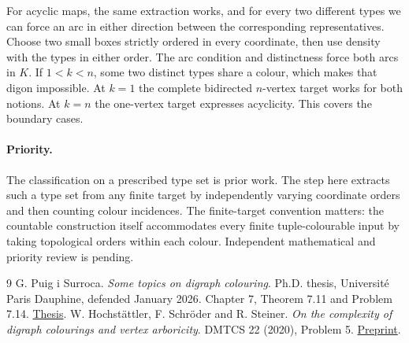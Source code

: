 \documentclass[11pt]{article}
\begin{document}
For acyclic maps, the same extraction works, and for every two different types we can force an arc in either direction between the corresponding representatives. Choose two small boxes strictly ordered in every coordinate, then use density with the types in either order. The arc condition and distinctness force both arcs in $K$. If $1<k<n$, some two distinct types share a colour, which makes that digon impossible. At $k=1$ the complete bidirected $n$-vertex target works for both notions. At $k=n$ the one-vertex target expresses acyclicity. This covers the boundary cases.

\paragraph{Priority.} The classification on a prescribed type set is prior work. The step here extracts such a type set from any finite target by independently varying coordinate orders and then counting colour incidences. The finite-target convention matters: the countable construction itself accommodates every finite tuple-colourable input by taking topological orders within each colour. Independent mathematical and priority review is pending.
\begin{thebibliography}{9}
 G. Puig i Surroca. \emph{Some topics on digraph colouring}. Ph.D. thesis, Universit\'e Paris Dauphine, defended January 2026. Chapter 7, Theorem 7.11 and Problem 7.14. \href{https://www.ub.edu/comb/koljaknauer/Gil_manuscript.pdf}{Thesis}.
 W. Hochst\"attler, F. Schr\"oder and R. Steiner. \emph{On the complexity of digraph colourings and vertex arboricity}. DMTCS 22 (2020), Problem 5. \href{https://arxiv.org/abs/1812.02420}{Preprint}.
\end{thebibliography}
\end{document}

